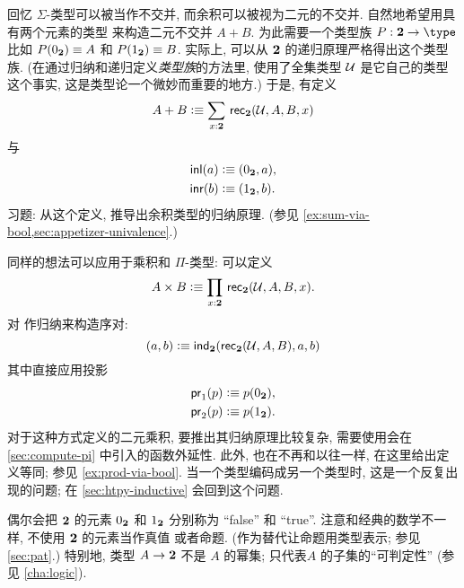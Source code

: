 回忆 $\Sigma$-类型可以被当作不交并, 而余积可以被视为二元的不交并.
自然地希望用具有两个元素的类型 \bool 来构造二元不交并 $A+B$.
为此需要一个类型族 $P:\bool\to\type$ 比如 $P({0_{\mathbf{2}}})\equiv A$ 和 $P({1_{\mathbf{2}}})\equiv B$.
实际上, 可以从 $\mathbf{2}$ 的递归原理严格得出这个类型族.
%
(在通过归纳和递归定义\emph{类型族}的方法里, 使用了全集类型 $\mathcal{U}$ 是它自己的类型这个事实, 这是类型论一个微妙而重要的地方.)
于是, 有定义
%
\[ A + B \defeq \sm{x:\bool} \rec{\bool}(\UU,A,B,x) \]
与
\begin{align*}
    {\mathsf{inl}}(a) &\vcentcolon\equiv ({0_{\mathbf{2}}},a), \\
    {\mathsf{inr}}(b) &\vcentcolon\equiv ({1_{\mathbf{2}}},b).
\end{align*}
习题: 从这个定义, 推导出余积类型的归纳原理.
(参见 \cref{ex:sum-via-bool,sec:appetizer-univalence}.)

同样的想法可以应用于乘积和 $\Pi$-类型: 可以定义
\[ A \times B \defeq \prd{x:\bool}\rec{\bool}(\UU,A,B,x). \]
对 \bool 作归纳来构造序对:
\[ (a,b) \vcentcolon\equiv \mathsf{ind}_{\mathbf{2}}(\mathsf{rec}_{\mathbf{2}}(\mathcal{U},A,B),a,b) \]
其中直接应用投影
\begin{align*}
    \mathsf{pr}_{1}(p) &\vcentcolon\equiv p({0_{\mathbf{2}}}), \\
    \mathsf{pr}_{2}(p) &\vcentcolon\equiv p({1_{\mathbf{2}}}).
\end{align*}
对于这种方式定义的二元乘积, 要推出其归纳原理比较复杂, 需要使用会在 \cref{sec:compute-pi} 中引入的函数外延性.
此外, 也在不再和以往一样, 在这里给出定义等同;
参见 \cref{ex:prod-via-bool}.
当一个类型编码成另一个类型时, 这是一个反复出现的问题;
在 \cref{sec:htpy-inductive} 会回到这个问题.

偶尔会把 $\mathbf{2}$ 的元素 ${0_{\mathbf{2}}}$ 和 ${1_{\mathbf{2}}}$ 分别称为 ``false'' 和 ``true''.
注意和经典的数学不一样, 不使用 $\mathbf{2}$ 的元素当作真值%
%
或者命题.
(作为替代让命题用类型表示;
参见 \cref{sec:pat}.)
特别地, 类型 $A \to \mathbf{2}$ 不是 $A$ 的幂集; 只代表$A$ 的子集的``可判定性'' (参见 \cref{cha:logic}).
%

%